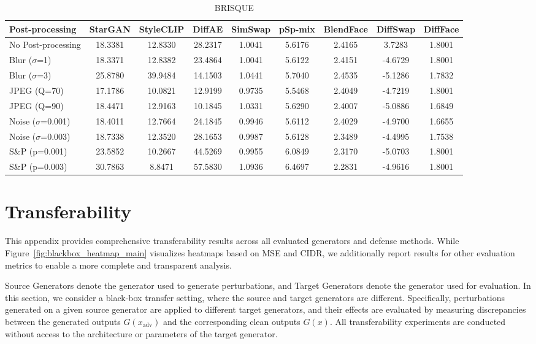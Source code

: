 \documentclass{article}
\begin{document}
\begin{table}[h!]
\begin{subtable}{\textwidth}
\caption{BRISQUE}
\centering
\scriptsize
\begin{tabular}{lcccccccc}
\toprule
\textbf{Post-processing} & StarGAN & StyleCLIP & DiffAE & SimSwap & pSp-mix & BlendFace & DiffSwap & DiffFace \\
\midrule
No Post-processing & 18.3381 & 12.8330 & 28.2317 & 1.0041 & 5.6176 & 2.4165 & 3.7283 & 1.8001 \\
\midrule
Blur ($\sigma$=1) & 18.3371 & 12.8382 & 23.4864 & 1.0041 & 5.6122 & 2.4151 & -4.6729 & 1.8001 \\
Blur ($\sigma$=3) & 25.8780 & 39.9484 & 14.1503 & 1.0441 & 5.7040 & 2.4535 & -5.1286 & 1.7832 \\
JPEG (Q=70) & 17.1786 & 10.0821 & 12.9199 & 0.9735 & 5.5468 & 2.4049 & -4.7219 & 1.8001 \\
JPEG (Q=90) & 18.4471 & 12.9163 & 10.1845 & 1.0331 & 5.6290 & 2.4007 & -5.0886 & 1.6849 \\
Noise ($\sigma$=0.001) & 18.4011 & 12.7664 & 24.1845 & 0.9946 & 5.6112 & 2.4029 & -4.9700 & 1.6655 \\
Noise ($\sigma$=0.003) & 18.7338 & 12.3520 & 28.1653 & 0.9987 & 5.6128 & 2.3489 & -4.4995 & 1.7538 \\
S\&P (p=0.001) & 23.5852 & 10.2667 & 44.5269 & 0.9955 & 6.0849 & 2.3170 & -5.0703 & 1.8001 \\
S\&P (p=0.003) & 30.7863 & 8.8471 & 57.5830 & 1.0936 & 6.4697 & 2.2831 & -4.9616 & 1.8001 \\
\bottomrule
\end{tabular}
\end{subtable}

\end{table}

\clearpage

\section{Transferability}
\label{appendix:transferability}
This appendix provides comprehensive transferability results across all evaluated generators and defense methods. While Figure~\ref{fig:blackbox_heatmap_main} visualizes heatmaps based on MSE and CIDR, we additionally report results for other evaluation metrics to enable a more complete and transparent analysis.

Source Generators denote the generator used to generate perturbations, and Target Generators denote the generator used for evaluation. In this section, we consider a black-box transfer setting, where the source and target generators are different. Specifically, perturbations generated on a given source generator are applied to different target generators, and their effects are evaluated by measuring discrepancies between the generated outputs $G(x_{\mathrm{adv}})$ and the corresponding clean outputs $G(x)$. All transferability experiments are conducted without access to the architecture or parameters of the target generator.
\end{document}
